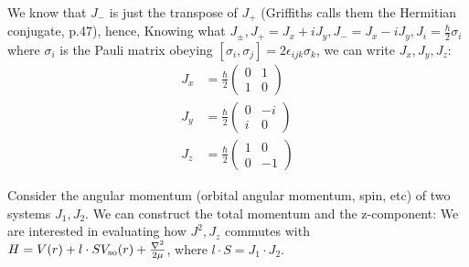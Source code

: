 \documentclass{school-22.101-notes}
\begin{document}
We know that $J_-$ is just the transpose of $J_+$ (Griffiths calls them the Hermitian conjugate, p.47), hence, 
Knowing what $J_{\pm}, J_+ = J_x + i J_y, J_- = J_x - iJ_y, J_i = \frac{\hbar}{2} \sigma_i$ where $\sigma_i$ is the Pauli matrix obeying $[ \sigma_i, \sigma_j] = 2 \epsilon_{ijk} \sigma_k$, we can write $J_x, J_y, J_z$: 
\begin{align}
  J_x &= \frac{\hbar}{2} \left( \begin{array}{cc} 0 & 1 \\ 1 & 0 \end{array} \right) \\
  J_y &= \frac{\hbar}{2} \left( \begin{array}{cc} 0 & -i \\ i & 0 \end{array} \right) \\
  J_z &= \frac{\hbar}{2} \left( \begin{array}{cc} 1 & 0 \\ 0 & -1 \end{array} \right) 
\end{align}





\clearpage
{}
Consider the angular momentum (orbital angular momentum, spin, etc) of two systems $J_1, J_2$. We can construct the total momentum and the z-component: 
We are interested in evaluating how $J^2, J_z$ commutes with $H = V(r) + l \cdot S V_{\mathrm{so}} (r) + \frac{\nabla^2}{2 \mu}$, where $l \cdot S = J_1 \cdot J_2$. 
\end{document}
